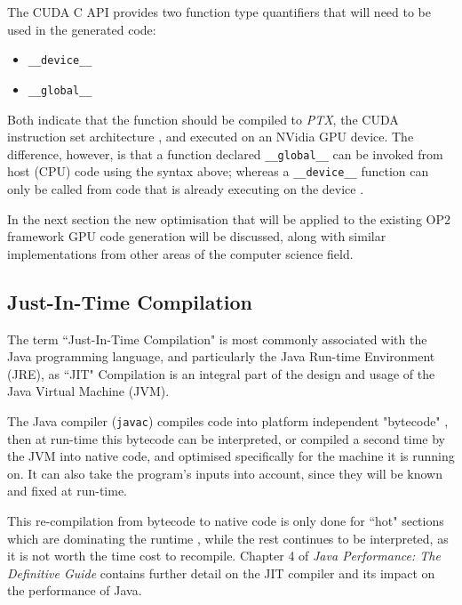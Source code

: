 
\noindent The CUDA C API provides two function type quantifiers that will need to be used in the generated code:
\begin{itemize}
\vspace{-.5cm}
\setlength{\itemsep}{0pt}%
\setlength{\parskip}{0pt}%
\item{\verb|__device__|}
\item{\verb|__global__|}
\vspace{-.5cm}
\end{itemize}
Both indicate that the function should be compiled to \textit{PTX}, the CUDA instruction set architecture \cite[p15]{guide}, and executed on an NVidia GPU device. The difference, however, is that a function declared \verb|__global__| can be invoked from host (CPU) code using the syntax above; whereas a \verb|__device__| function can only be called from code that is already executing on the device \cite[p81]{guide}.
\par
In the next section the new optimisation that will be applied to the existing OP2 framework GPU code generation will be discussed, along with similar implementations from other areas of the computer science field.
\clearpage
\subsection{Just-In-Time Compilation}
\label{ss:rw_JIT}

The term ``Just-In-Time Compilation" is most commonly associated with the Java programming language, and particularly the Java Run-time Environment (JRE), as ``JIT" Compilation is an integral part of the design and usage of the Java Virtual Machine (JVM).

\par The Java compiler (\verb|javac|) compiles code into platform independent "bytecode" \cite{javac}, then at run-time this bytecode can be interpreted, or compiled a second time by the JVM into native code, and optimised specifically for the machine it is running on. It can also take the program's inputs into account, since they will be known and fixed at run-time.
\par
This re-compilation from bytecode to native code is only done for ``hot" sections which are dominating the runtime \cite{javac}, while the rest continues to be interpreted, as it is not worth the time cost to recompile. Chapter 4 of \textit{Java Performance: The Definitive Guide} \cite{javaPerf} contains further detail on the JIT compiler and its impact on the performance of Java.
\par

